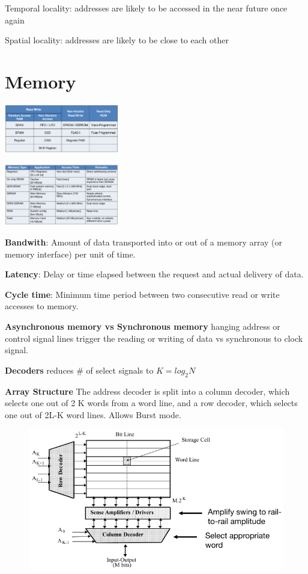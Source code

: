 \documentclass[english]{latex4ei/latex4ei_sheet}
\begin{document}
Temporal locality: addresses are likely to be accessed in the near future once again

Spatial locality: addresses are likely to be close to each other

\section{Memory}
\begin{center}
	\includegraphics[width=5cm]{images/5.Memory/MemoryClassificatoin.png}
\end{center}
\begin{center}
	\includegraphics[width=5cm]{images/5.Memory/MemoryCharacteristics.png}
\end{center}

\textbf{Bandwith}: Amount of data transported into or out of a memory array (or
memory interface) per unit of time.

\textbf{Latency}: Delay or time elapsed between the request and actual delivery of data.

\textbf{Cycle time}: Minimum time period between two consecutive read or write accesses
to memory.

\textbf{Asynchronous memory vs Synchronous memory} hanging address or
control signal lines trigger the reading or writing of data vs synchronous to clock signal.

\textbf{Decoders} reduces \# of select signals to $K = log_2 N$

\textbf{Array Structure} The address decoder is split into a column decoder, which selects one out of 2 K words from a word line, and a row decoder, which selects one out of 2L-K word lines. Allows Burst mode.
\begin{figure}
	\centering
	\includegraphics[width=1\linewidth]{images//5.Memory/ArrayStructure.png}
\end{figure}
\end{document}
